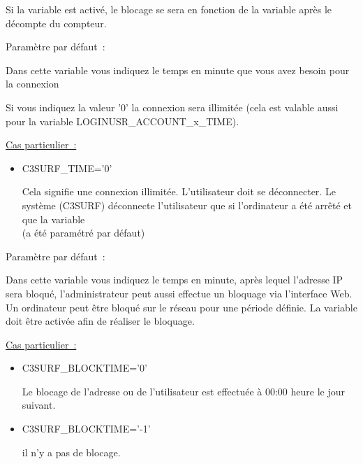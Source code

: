 \begin{itemize}
\begin{description}
   Si la variable  est activé, le blocage se sera
   en fonction de la variable  après le décompte
   du compteur.


  Paramètre par défaut~: 

  Dans cette variable vous indiquez le temps en minute que vous avez besoin pour la connexion

  Si vous indiquez la valeur '0' la connexion sera illimitée (cela est valable aussi
  pour la variable LOGINUSR\_ACCOUNT\_x\_TIME).

  \underline{Cas particulier~:}
    \begin{itemize}
      \item{C3SURF\_TIME='0'}

      Cela signifie une connexion illimitée. L'utilisateur doit se déconnecter.
	  Le système (C3SURF) déconnecte l'utilisateur que si l'ordinateur a été arrêté et
	  que la variable\\
	   (a été paramétré par défaut)
    \end{itemize}


  Paramètre par défaut~: 

  Dans cette variable vous indiquez le temps en minute, après lequel l'adresse IP sera
  bloqué, l'administrateur peut aussi effectue un bloquage via l'interface Web. Un ordinateur
  peut être bloqué sur le réseau pour une période définie. La variable
   doit être activée afin de réaliser le bloquage.

  \underline{Cas particulier~:}\\
    \begin{itemize}
      \item{C3SURF\_BLOCKTIME='0'}

            Le blocage de l'adresse ou de l'utilisateur est effectuée à 00:00 heure
			le jour suivant.

       \item{C3SURF\_BLOCKTIME='-1'}

             il n'y a pas de blocage.
     \end{itemize}



\end{description}
\end{itemize}

